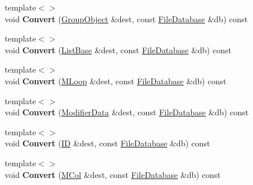 \begin{DoxyCompactItemize}
\item 
\hypertarget{class_assimp_1_1_blender_1_1_structure_a143552873776d4fc9a49eed6aa1f25c6}{{\footnotesize template$<$$>$ }\\void {\bfseries Convert} (\hyperlink{struct_assimp_1_1_blender_1_1_group_object}{Group\+Object} \&dest, const \hyperlink{class_assimp_1_1_blender_1_1_file_database}{File\+Database} \&db) const }\label{class_assimp_1_1_blender_1_1_structure_a143552873776d4fc9a49eed6aa1f25c6}

\item 
\hypertarget{class_assimp_1_1_blender_1_1_structure_a64aa35a760b020f580431bea70edb246}{{\footnotesize template$<$$>$ }\\void {\bfseries Convert} (\hyperlink{struct_assimp_1_1_blender_1_1_list_base}{List\+Base} \&dest, const \hyperlink{class_assimp_1_1_blender_1_1_file_database}{File\+Database} \&db) const }\label{class_assimp_1_1_blender_1_1_structure_a64aa35a760b020f580431bea70edb246}

\item 
\hypertarget{class_assimp_1_1_blender_1_1_structure_a7769d18f58a6e79e66e09c73e8fac655}{{\footnotesize template$<$$>$ }\\void {\bfseries Convert} (\hyperlink{struct_assimp_1_1_blender_1_1_m_loop}{M\+Loop} \&dest, const \hyperlink{class_assimp_1_1_blender_1_1_file_database}{File\+Database} \&db) const }\label{class_assimp_1_1_blender_1_1_structure_a7769d18f58a6e79e66e09c73e8fac655}

\item 
\hypertarget{class_assimp_1_1_blender_1_1_structure_ab5cfa99586d1594a1a48132ead5921e6}{{\footnotesize template$<$$>$ }\\void {\bfseries Convert} (\hyperlink{struct_assimp_1_1_blender_1_1_modifier_data}{Modifier\+Data} \&dest, const \hyperlink{class_assimp_1_1_blender_1_1_file_database}{File\+Database} \&db) const }\label{class_assimp_1_1_blender_1_1_structure_ab5cfa99586d1594a1a48132ead5921e6}

\item 
\hypertarget{class_assimp_1_1_blender_1_1_structure_a830db7dcfbcc246c07dd6c3a1e6d2d68}{{\footnotesize template$<$$>$ }\\void {\bfseries Convert} (\hyperlink{struct_assimp_1_1_blender_1_1_i_d}{I\+D} \&dest, const \hyperlink{class_assimp_1_1_blender_1_1_file_database}{File\+Database} \&db) const }\label{class_assimp_1_1_blender_1_1_structure_a830db7dcfbcc246c07dd6c3a1e6d2d68}

\item 
\hypertarget{class_assimp_1_1_blender_1_1_structure_a6f0a4bed83cad1a7d6f07596983dbae0}{{\footnotesize template$<$$>$ }\\void {\bfseries Convert} (\hyperlink{struct_assimp_1_1_blender_1_1_m_col}{M\+Col} \&dest, const \hyperlink{class_assimp_1_1_blender_1_1_file_database}{File\+Database} \&db) const }\label{class_assimp_1_1_blender_1_1_structure_a6f0a4bed83cad1a7d6f07596983dbae0}


\end{DoxyCompactItemize}

